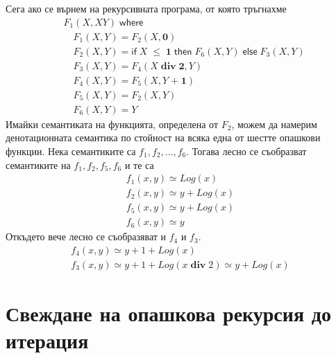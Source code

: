 \documentclass[14pt]{extarticle}
\begin{document}
Сега ако се върнем на рекурсивната програма, от която тръгнахме
\begin{align*}
    & F_1(X, XY) \; \mathsf{where} \\
    & \quad  F_1(X, Y) = F_2(X, \mathbf 0) \\
    & \quad F_2(X, Y) = \mathsf{if} \; X \;\mathbf{\leq}\; \mathbf 1 \; \mathsf{then} \; F_6(X, Y)  \; \mathsf{else} \; F_3(X, Y) \\
    & \quad F_3(X, Y) = F_4(X \;\mathbf{div}\; \mathbf 2, Y) \\
    & \quad F_4(X, Y) = F_5(X, Y \;\mathbf{+}\; \mathbf 1) \\
    & \quad F_5(X, Y) = F_2(X, Y) \\
    & \quad F_6(X, Y) = Y
\end{align*}
Имайки семантиката на функцията, определена от \(F_2\), можем да намерим денотационната семантика по стойност на всяка една от шестте опашкови функции. Нека семантиките са \(f_1, f_2, \dots, f_6\). Тогава лесно се съобразват семантиките на \(f_1, f_2, f_5, f_6\) и те са
\begin{align*}
    f_1(x, y) \simeq Log(x) \\
    f_2(x, y) \simeq y + Log(x) \\
    f_5(x, y) \simeq y + Log(x) \\
    f_6(x, y) \simeq y
\end{align*}
Откъдето вече лесно се съобразяват и \(f_4\) и \(f_3\).
\begin{align*}
    f_4(x, y) \simeq y + 1 + Log(x) \\
    f_3(x, y) \simeq y + 1 + Log(x \;\mathbf{div}\; 2) \simeq y + Log(x)
\end{align*}
\section*{Свеждане на опашкова рекурсия до итерация}
\end{document}
